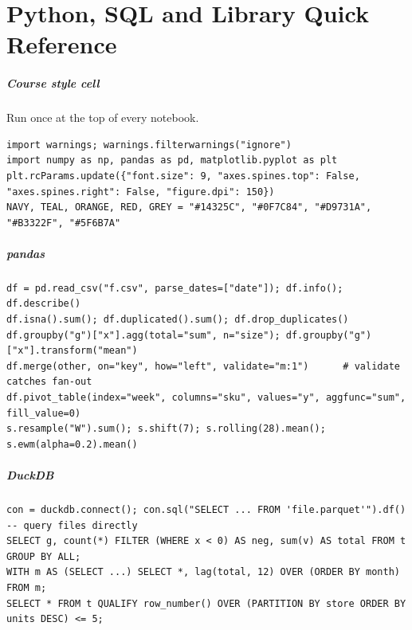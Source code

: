 \chapter{Python, SQL and Library Quick Reference}
\paragraph{Course style cell} Run once at the top of every notebook.
\begin{lstlisting}[style=py,caption={Plot style and colours used in every lab.}]
import warnings; warnings.filterwarnings("ignore")
import numpy as np, pandas as pd, matplotlib.pyplot as plt
plt.rcParams.update({"font.size": 9, "axes.spines.top": False, "axes.spines.right": False, "figure.dpi": 150})
NAVY, TEAL, ORANGE, RED, GREY = "#14325C", "#0F7C84", "#D9731A", "#B3322F", "#5F6B7A"
\end{lstlisting}

\paragraph{pandas}
\begin{lstlisting}[style=py,numbers=none,xleftmargin=4pt,framexleftmargin=4pt]
df = pd.read_csv("f.csv", parse_dates=["date"]); df.info(); df.describe()
df.isna().sum(); df.duplicated().sum(); df.drop_duplicates()
df.groupby("g")["x"].agg(total="sum", n="size"); df.groupby("g")["x"].transform("mean")
df.merge(other, on="key", how="left", validate="m:1")      # validate catches fan-out
df.pivot_table(index="week", columns="sku", values="y", aggfunc="sum", fill_value=0)
s.resample("W").sum(); s.shift(7); s.rolling(28).mean(); s.ewm(alpha=0.2).mean()
\end{lstlisting}

\paragraph{DuckDB}
\begin{lstlisting}[style=sql,numbers=none,xleftmargin=4pt,framexleftmargin=4pt]
con = duckdb.connect(); con.sql("SELECT ... FROM 'file.parquet'").df()      -- query files directly
SELECT g, count(*) FILTER (WHERE x < 0) AS neg, sum(v) AS total FROM t GROUP BY ALL;
WITH m AS (SELECT ...) SELECT *, lag(total, 12) OVER (ORDER BY month) FROM m;
SELECT * FROM t QUALIFY row_number() OVER (PARTITION BY store ORDER BY units DESC) <= 5;
\end{lstlisting}

